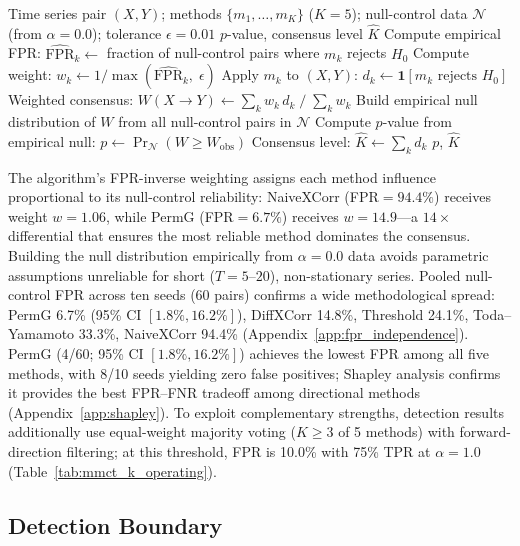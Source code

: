 \begin{algorithm}[t]
\caption{Multi-Method Consensus Test (MMCT)}
\label{alg:mmct}
\begin{algorithmic}[1]
\Require Time series pair $(X, Y)$; methods $\{m_1, \ldots, m_K\}$ ($K{=}5$); null-control data $\mathcal{N}$ (from $\alpha{=}0.0$); tolerance $\epsilon{=}0.01$
\Ensure $p$-value, consensus level $\hat{K}$
    \State Compute empirical FPR: $\widehat{\mathrm{FPR}}_k \gets$ fraction of null-control pairs where $m_k$ rejects $H_0$
    \State Compute weight: $w_k \gets 1 / \max(\widehat{\mathrm{FPR}}_k,\; \epsilon)$
    \State Apply $m_k$ to $(X, Y)$: $d_k \gets \mathbf{1}[m_k \text{ rejects } H_0]$
\EndFor
\State Weighted consensus: $W(X {\to} Y) \gets \sum_{k} w_k \, d_k \;/\; \sum_{k} w_k$
\State Build empirical null distribution of $W$ from all null-control pairs in $\mathcal{N}$
\State Compute $p$-value from empirical null: $p \gets \Pr_{\mathcal{N}}(W \geq W_{\mathrm{obs}})$
\State Consensus level: $\hat{K} \gets \sum_{k} d_k$
\State \Return $p$, $\hat{K}$
\end{algorithmic}
\end{algorithm}

The algorithm's FPR-inverse weighting assigns each method influence proportional to its null-control reliability: NaiveXCorr (FPR${=}94.4\%$) receives weight $w{=}1.06$, while PermG (FPR${=}6.7\%$) receives $w{=}14.9$---a $14{\times}$ differential that ensures the most reliable method dominates the consensus.
Building the null distribution empirically from $\alpha{=}0.0$ data avoids parametric assumptions unreliable for short ($T{=}5$--$20$), non-stationary series.
Pooled null-control FPR across ten seeds (60 pairs) confirms a wide methodological spread: PermG 6.7\% (95\% CI $[1.8\%, 16.2\%]$), DiffXCorr 14.8\%, Threshold 24.1\%, Toda--Yamamoto 33.3\%, NaiveXCorr 94.4\% (Appendix~\ref{app:fpr_independence}).
PermG (4/60; 95\% CI $[1.8\%, 16.2\%]$) achieves the lowest FPR among all five methods, with 8/10 seeds yielding zero false positives; Shapley analysis confirms it provides the best FPR--FNR tradeoff among directional methods (Appendix~\ref{app:shapley}).
To exploit complementary strengths, detection results additionally use equal-weight majority voting ($K{\geq}3$ of 5 methods) with forward-direction filtering; at this threshold, FPR is 10.0\% with 75\% TPR at $\alpha{=}1.0$ (Table~\ref{tab:mmct_k_operating}).

\FloatBarrier

\subsection{Detection Boundary}
\label{sec:theory}

